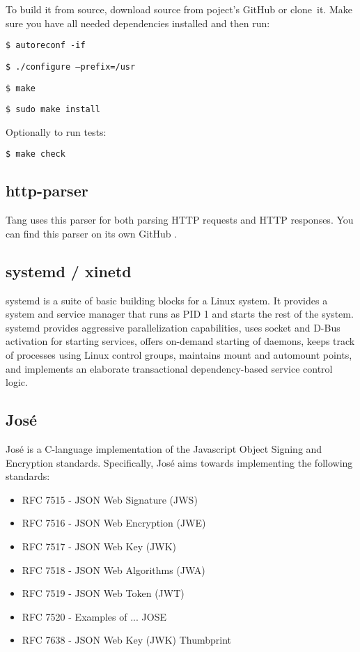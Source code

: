 \documentclass[../xdudla00-porting-Tang-to-Open-WRT.tex]{subfiles}
\begin{document}
To build it from source, download source from poject's GitHub \cite{github} or clone~it.
Make sure you have all needed dependencies installed and then run:

{\tt \$ autoreconf -if}

{\tt \$ ./configure --prefix=/usr}

{\tt \$ make}

{\tt \$ sudo make install}

Optionally to run tests:

{\tt \$ make check}

\subsection{http-parser}\label{http-parser}
Tang uses this parser for both parsing HTTP requests and HTTP responses.
You can find this parser on its own GitHub \cite{http-parser}.

\subsection{systemd / xinetd}\label{systemd}
systemd \cite{systemd} is a suite of basic building blocks for a Linux \cite{linux} system.
It provides a system and service manager that runs as PID \cite{pid} 1 and starts the rest of the system.
systemd provides aggressive parallelization capabilities, uses socket \cite{socket} and D-Bus \cite{Dbus} activation for starting services,
 offers on-demand starting of daemons, keeps track of processes using Linux control groups, maintains mount and automount points,
 and implements an elaborate transactional dependency-based service control logic.

\subsection{José}\label{jose}
José \cite{Jos} is a C-language implementation of the Javascript \cite{javascript} Object Signing and Encryption standards.
Specifically, José aims towards implementing the following standards:
\begin{itemize}
   \item RFC 7515 - JSON Web Signature (JWS)        \cite{JWS}
   \item RFC 7516 - JSON Web Encryption (JWE)       \cite{JWE}
   \item RFC 7517 - JSON Web Key (JWK)              \cite{JWK}
   \item RFC 7518 - JSON Web Algorithms (JWA)       \cite{JWA}
   \item RFC 7519 - JSON Web Token (JWT)            \cite{JWT}
   \item RFC 7520 - Examples of ... JOSE            \cite{exJose}
   \item RFC 7638 - JSON Web Key (JWK) Thumbprint   \cite{JWK}
\end{itemize}
\end{document}
